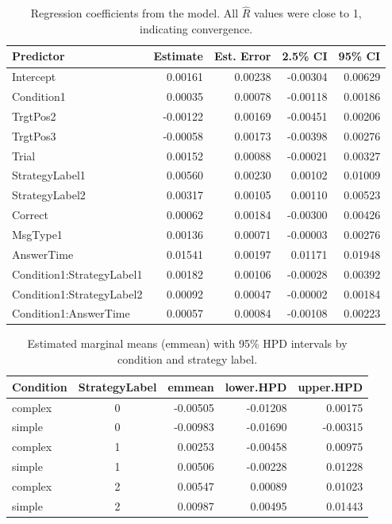 \begin{table}[ht]
\centering
\caption{Regression coefficients from the model. All $\hat{R}$ values were close to 1, indicating convergence.}
\begin{tabular}{lrrrr}
\hline
\textbf{Predictor} & \textbf{Estimate} & \textbf{Est. Error} & \textbf{2.5\% CI} & \textbf{95\% CI} \\
\hline
Intercept                  & 0.00161 & 0.00238 & -0.00304 & 0.00629 \\
Condition1                 & 0.00035 & 0.00078 & -0.00118 & 0.00186 \\
TrgtPos2                    & -0.00122 & 0.00169 & -0.00451 & 0.00206 \\
TrgtPos3                    & -0.00058 & 0.00173 & -0.00398 & 0.00276 \\
Trial                       & 0.00152 & 0.00088 & -0.00021 & 0.00327 \\
StrategyLabel1              & 0.00560 & 0.00230 & 0.00102  & 0.01009 \\
StrategyLabel2              & 0.00317 & 0.00105 & 0.00110  & 0.00523 \\
Correct                     & 0.00062 & 0.00184 & -0.00300 & 0.00426 \\
MsgType1                    & 0.00136 & 0.00071 & -0.00003 & 0.00276 \\
AnswerTime                  & 0.01541 & 0.00197 & 0.01171  & 0.01948 \\
Condition1:StrategyLabel1   & 0.00182 & 0.00106 & -0.00028 & 0.00392 \\
Condition1:StrategyLabel2   & 0.00092 & 0.00047 & -0.00002 & 0.00184 \\
Condition1:AnswerTime       & 0.00057 & 0.00084 & -0.00108 & 0.00223 \\
\hline
\end{tabular}
\end{table}



\begin{table}[ht]
\centering
\begin{tabular}{l c r r r}
\hline
Condition & StrategyLabel & emmean & lower.HPD & upper.HPD \\
\hline
complex & 0 & -0.00505 & -0.01208 &  0.00175 \\
simple  & 0 & -0.00983 & -0.01690 & -0.00315 \\
complex & 1 &  0.00253 & -0.00458 &  0.00975 \\
simple  & 1 &  0.00506 & -0.00228 &  0.01228 \\
complex & 2 &  0.00547 &  0.00089 &  0.01023 \\
simple  & 2 &  0.00987 &  0.00495 &  0.01443 \\
\hline
\end{tabular}
\caption{Estimated marginal means (emmean) with 95\% HPD intervals by condition and strategy label.}
\label{tab:emmean}
\end{table}




